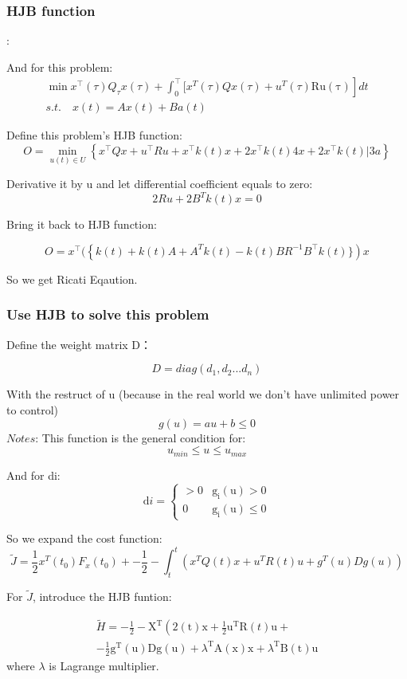 \documentclass{mcmthesis}
\begin{document}
\subsubsection{HJB function}:

And for this problem:
$$\begin{array}{l}
\left.\min x^{\top}(\tau) Q_{\tau} x(\tau)+\int_{0}^{\top}[x^T(\tau) Q x(\tau)+{u^T}(\tau) \operatorname{R u(\tau)}\right] d t \\
s .t. \quad {x}(t)=A x(t)+B a(t)
\end{array}$$

Define this problem's HJB function:
$$O=\min _{u(t) \in U} \left\{x^{\top} Q x+u^{\top} R u+x^{\top} k(t) x+2 x^{\top} k(t) 4 x+2 x^{\top} k(t) | 3 a\right\}$$

Derivative  it by u and let differential coefficient equals to zero:
$$2 R u+2 B^{T} k(t) x=0$$

Bring it back to HJB function:

$$O=x^{\top}(\left\{k(t)+k(t) A+A^Tk(t)-k(t) B R^{-1} B^{\top}k(t)\}\right )x$$

So we get Ricati Eqaution.

\subsubsection{Use HJB to solve this problem}

Define the weight matrix D：

$$D=diag(d_1,d_2...d_n)$$

With the restruct of u (because in the real world we don't have unlimited power to control)
$$g(u)=a u+b \leqslant 0$$
$Notes$: This function is the general condition for:
$$u_{min} \leqslant u \leqslant u_{max}$$

And for di:
$$\mathrm{d} i=\left\{\begin{array}{ll}
>0 & \mathrm{g}_{\mathrm{i}}(\mathrm{u})>0 \\
0 & \mathrm{g}_{\mathrm{i}}(\mathrm{u}) \leqslant 0
\end{array}\right.$$

So we expand the cost function:
$$\tilde{J}=\frac{1}{2} x^{T}\left(t_{0}\right) F_{x}\left(t_{0}\right)+-\frac{1}{2}-\int_{t}^{t}(  x^T Q(t)x+u^T R(t)u +g^T(u)Dg(u) )$$

For $\tilde{J}$, introduce the HJB funtion:

$$\begin{array}{l}
\widetilde{H}=-\frac{1}{2}-\mathrm{X}^{\mathrm{T}}\left(2(\mathrm{t}) \mathrm{x}+\frac{1}{2} \mathrm{u}^{\mathrm{T}} \mathrm{R}(t) \mathrm{u}+\right. \\
-\frac{1}{2} \mathrm{g}^{\mathrm{T}}(\mathrm{u}) \mathrm{Dg}(\mathrm{u})+\lambda^{\mathrm{T}} \mathrm{A}(\mathrm{x}) \mathrm{x}+\lambda^{\mathrm{T}} \mathrm{B}(\mathrm{t}) \mathrm{u}
\end{array}$$
where $\lambda$ is Lagrange multiplier.
\end{document}
